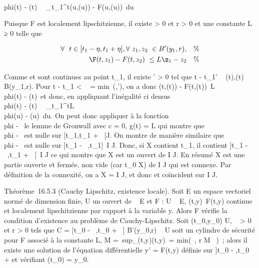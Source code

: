 \documentclass[]{article}
\begin{document}
\\phi(t) - \psi(t)\
\leq\int ~
_t_1^t\F(u,\phi(u)) -
F(u,\psi(u))\ du

Puisque F est localement lipschitzienne, il existe \eta \textgreater{} 0 et
r \textgreater{} 0 et une constante L ≥ 0 telle que

\begin{align*} \forall~~t \in
{[}t_1 - \eta,t_1 + \eta{]},
\forall~z_1,z_2~ \in
B'(y_1,r),& & \%& \\
\F(t,z_1) -
F(t,z_2)\ \leq
L\z_1 -
z_2& & \%&
\\ \end{align*}

Comme \phi et \psi sont continues au point t_1, il existe \eta'
\textgreater{} 0 tel que t - t_1\leq \eta' \rigtharrow~
\phi(t),\psi(t) \in B(y_1,r). Pour t - t_1
\textless{} \alpha~ = min~(\eta,\eta'), on a donc
\F(t,\phi(t)) -
F(t,\psi(t))\ \leq L\\phi(t) -
\psi(t)\, et donc, en appliquant l'inégalité ci
dessus \\phi(t) - \psi(t)\
\leq\int ~
_t_1^tL\\phi(u) -
\psi(u)\ du. On peut donc appliquer à la fonction
\\phi - \psi\ le lemme de
Gronwall avec c = 0, g(t) = L qui montre que \\phi
- \psi\ est nulle sur {[}t_1,t_1
+ \alpha~{[}\bigcapI \bigcap J. On montre de manière similaire que
\\phi - \psi\ est nulle sur
{]}t_1 - \alpha~,t_1{]}\, \bigcap I \bigcap J. Donc, si X
contient t_1, il contient {]}t_1 - \alpha~,t_1 +
\alpha~{[}\, \bigcap I \bigcap J ce qui montre que X est un ouvert de I \bigcap
J. En résumé X est une partie ouverte et fermée, non vide (car
t_0 \in X) de I \bigcap J qui est connexe. Par définition de la
connexité, on a X = I \bigcap J, et donc \phi et \psi coïncident sur I \bigcap J.

Théorème~16.5.3 (Cauchy Lipschitz, existence locale). Soit E un espace
vectoriel normé de dimension finie, U un ouvert de ~ \times E et F : U \rightarrow~ E,
(t,y)\mapsto~F(t,y) continue et localement
lipschitzienne par rapport à la variable y. Alors F vérifie la condition
d'existence au problème de Cauchy-Lipschitz. Soit
(t_0,y_0) \in U, \alpha~ \textgreater{} 0 et r \textgreater{}
0 tels que C = {[}t_0 - \alpha~,t_0 + \alpha~{]} \times
B'(y_0,r) \subset~ U soit un cylindre de sécurité pour F associé à la
constante L, M =\
sup_(t,y)\inC\F(t,y)\,
\eta = min(\alpha~, r \over M~ )~;
alors il existe une solution \phi de l'équation différentielle y' = F(t,y)
définie sur {]}t_0 - \eta,t_0 + \eta{[} et vérifiant
\phi(t_0) = y_0.
\end{document}
